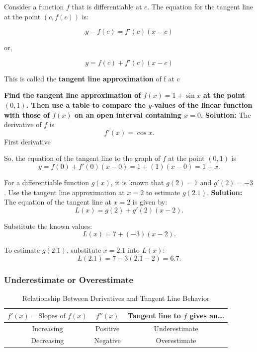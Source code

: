 \documentclass[12pt]{article}
\theoremstyle{beautifulthm}
\begin{document}
\textbf{}
Consider a function $f$ that is differentiable at $c$. The equation for the tangent line at the point $(c, f(c))$ is:

\[
y - f(c) = f'(c)(x - c)
\]

or, 

\[
y = f(c) + f'(c)(x - c)
\]

This is called the \textbf{tangent line approximation} of f at c

\begin{tcolorbox}[colback=examplebg, colframe=red!75!black, title=\textbf{EXAMPLE 1: Using a Tangent Line Approximation}, fonttitle=\bfseries, sharp corners]
\textbf{Find the tangent line approximation of \( f(x) = 1 + \sin x \) at the point \( (0, 1) \). Then use a table to compare the \(y\)-values of the linear function with those of \( f(x) \) on an open interval containing \( x = 0 \).}
\tcblower
\textbf{Solution:} The derivative of \( f \) is
\[
f'(x) = \cos x.
\]
First derivative

So, the equation of the tangent line to the graph of \( f \) at the point \( (0, 1) \) is
\[
y = f(0) + f'(0)(x - 0) = 1 + (1)(x - 0) = 1 + x.
\]
\end{tcolorbox}



\begin{tcolorbox}[colback=examplebg, colframe=red!75!black, title=\textbf{EXAMPLE 2: Using a Tangent Line Approximation}, fonttitle=\bfseries, sharp corners]
For a differentiable function \( g(x) \), it is known that \( g(2) = 7 \) and \( g'(2) = -3 \). Use the tangent line approximation at \( x = 2 \) to estimate \( g(2.1) \).
\tcblower
\textbf{Solution:} 
The equation of the tangent line at \( x = 2 \) is given by:
\[
L(x) = g(2) + g'(2)(x - 2).
\]

Substitute the known values:
\[
L(x) = 7 + (-3)(x - 2).
\]

To estimate \( g(2.1) \), substitute \( x = 2.1 \) into \( L(x) \):
\[
L(2.1) = 7 - 3(2.1 - 2)= 6.7.
\]


\end{tcolorbox}



\subsubsection{Underestimate or Overestimate}
\begin{table}[h!]
\centering
\renewcommand{\arraystretch}{1.5} %
\begin{tabular}{|c|c|c|}
\hline
\textbf{\( f'(x) = \text{Slopes of } f(x) \)} & \textbf{\( f''(x) \)} & \textbf{Tangent line to \( f \) gives an...} \\ \hline
Increasing & Positive & Underestimate \\ \hline
Decreasing & Negative & Overestimate \\ \hline
\end{tabular}
\caption{Relationship Between Derivatives and Tangent Line Behavior}
\end{table}
\end{document}
